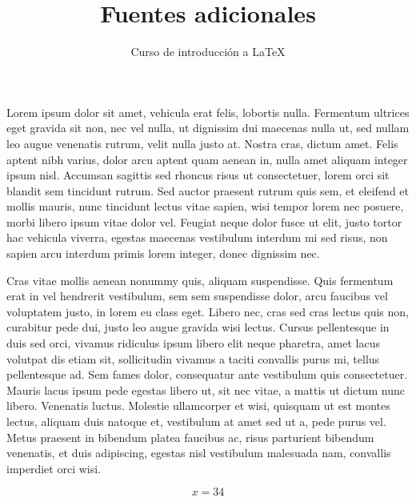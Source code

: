 \documentclass[10pt,letterpaper]{article}
\author{Curso de introducción a LaTeX}
\title{Fuentes adicionales}
\begin{document}
\maketitle
	 Lorem ipsum dolor sit amet, vehicula erat felis, lobortis nulla. Fermentum ultrices eget gravida sit non, nec vel nulla, ut dignissim dui maecenas nulla ut, sed nullam leo augue venenatis rutrum, velit nulla justo at. Nostra cras, dictum amet. Felis aptent nibh varius, dolor arcu aptent quam aenean in, nulla amet aliquam integer ipsum nisl. Accumsan sagittis sed rhoncus risus ut consectetuer, lorem orci sit blandit sem tincidunt rutrum. Sed auctor praesent rutrum quis sem, et eleifend et mollis mauris, nunc tincidunt lectus vitae sapien, wisi tempor lorem nec posuere, morbi libero ipsum vitae dolor vel. Feugiat neque dolor fusce ut elit, justo tortor hac vehicula viverra, egestas maecenas vestibulum interdum mi sed risus, non sapien arcu interdum primis lorem integer, donec dignissim nec.

	 Cras vitae mollis aenean nonummy quis, aliquam suspendisse. Quis fermentum erat in vel hendrerit vestibulum, sem sem suspendisse dolor, arcu faucibus vel voluptatem justo, in lorem eu class eget. Libero nec, cras sed cras lectus quis non, curabitur pede dui, justo leo augue gravida wisi lectus. Cursus pellentesque in duis sed orci, vivamus ridiculus ipsum libero elit neque pharetra, amet lacus volutpat dis etiam sit, sollicitudin vivamus a taciti convallis purus mi, tellus pellentesque ad. Sem fames dolor, consequatur ante vestibulum quis consectetuer. Mauris lacus ipsum pede egestas libero ut, sit nec vitae, a mattis ut dictum nunc libero. Venenatis luctus. Molestie ullamcorper et wisi, quisquam ut est montes lectus, aliquam duis natoque et, vestibulum at amet sed ut a, pede purus vel. Metus praesent in bibendum platea faucibus ac, risus parturient bibendum venenatis, et duis adipiscing, egestas nisl vestibulum malesuada nam, convallis imperdiet orci wisi.
	 
	 \[ x = 34\]
\end{document}

